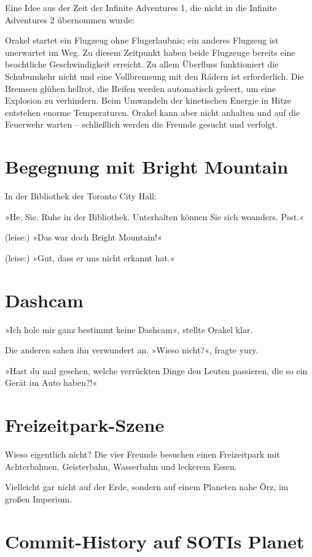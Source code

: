 Eine Idee aus der Zeit der Infinite Adventures 1, die nicht in die Infinite Adventures 2 übernommen wurde:

Orakel startet ein Flugzeug ohne Flugerlaubnis; ein anderes Flugzeug ist unerwartet im Weg. Zu diesem Zeitpunkt haben beide Flugzeuge bereits eine beachtliche Geschwindigkeit erreicht. Zu allem Überfluss funktioniert die Schubumkehr nicht und eine Vollbremsung mit den Rädern ist erforderlich. Die Bremsen glühen hellrot, die Reifen werden automatisch geleert, um eine Explosion zu verhindern. Beim Umwandeln der kinetischen Energie in Hitze entstehen enorme Temperaturen. Orakel kann aber nicht anhalten und auf die Feuerwehr warten – schließlich werden die Freunde gesucht und verfolgt.


\chapter{Begegnung mit Bright Mountain}

In der Bibliothek der Toronto City Hall:

»He, Sie. Ruhe in der Bibliothek. Unterhalten können Sie sich woanders. Psst.«

(leise:) »Das war doch Bright Mountain!«

(leise:) »Gut, dass er uns nicht erkannt hat.«


\chapter{Dashcam}

»Ich hole mir ganz bestimmt keine Dashcam«, stellte Orakel klar.

Die anderen sahen ihn verwundert an. »Wieso nicht?«, fragte yury.

»Hast du mal gesehen, welche verrückten Dinge den Leuten passieren, die so ein Gerät im Auto haben?!«


\chapter{Freizeitpark-Szene}

Wieso eigentlich nicht? Die vier Freunde besuchen einen Freizeitpark mit Achterbahnen, Geisterbahn, Wasserbahn und leckerem Essen.

Vielleicht gar nicht auf der Erde, sondern auf einem Planeten nahe Örz, im großen Imperium.


\chapter{Commit-History auf SOTIs Planet}

